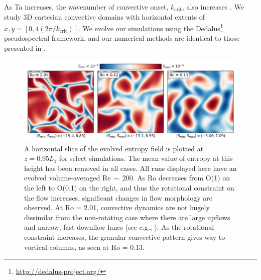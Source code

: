\documentclass[twocolumn, amsmath, amsfonts, amssymb]{aastex62}
\begin{document}
As Ta increases, the wavenumber of convective onset, $k_{\text{crit}}$, also increases
\citep{calkins&all2015a}. 
We study 3D cartesian convective domains with horizontal extents of
$x, y = [0, 4(2\pi/k_{\text{crit}})]$. 
We evolve our simulations using the Dedalus\footnote{\url{http://dedalus-project.org/}} 
pseudospectral framework, and our numerical methods are identical to those presented
in \AB.


\begin{figure}[t]
\includegraphics[width=\textwidth]{dynamics_plot.png}
\caption{ A horizontal slice of the evolved entropy field is plotted at $z = 0.95L_z$
for select simulations. The mean value of entropy at this height has been removed in all
cases. All runs displayed here have an evolved volume-averaged Re$\,\sim\,200$. 
As Ro decreases from O(1) on the left to O(0.1) on the right, and thus the rotational
constraint on the flow increases, significant changes in flow morphology are observed.
At Ro = 2.01, convective dynamics are not hugely dissimilar from the non-rotating
case where there are large upflows and narrow, fast downflow lanes (see e.g., \AB).
As the rotational constraint increases, the granular convective pattern gives way
to vortical columns, as seen at Ro = 0.13.
\label{fig:pretty_convection} }
\end{figure}
\end{document}
